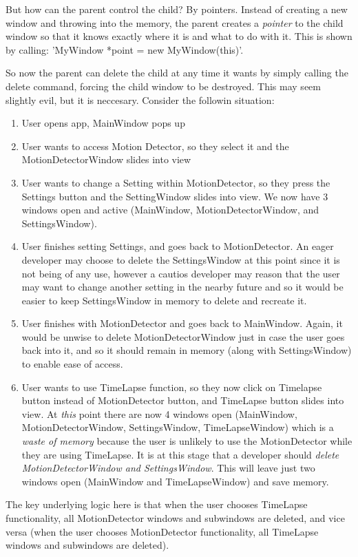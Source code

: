 But how can the parent control the child? By pointers. Instead of creating a new window and throwing into the memory, the parent creates a {\it pointer} to the child window so that it knows exactly where it is and what to do with it. This is shown by calling:
'MyWindow *point = new MyWindow(this)'.

So now the parent can delete the child at any time it wants by simply calling the delete command, forcing the child window to be destroyed. This may seem slightly evil, but it is neccesary. Consider the followin situation:
\begin{enumerate}
\item User opens app, MainWindow pops up
\item User wants to access Motion Detector, so they select it and the MotionDetectorWindow slides into view
\item User wants to change a Setting within MotionDetector, so they press the Settings button and the SettingWindow slides into view. We now have 3 windows open and active (MainWindow, MotionDetectorWindow, and SettingsWindow).
\item User finishes setting Settings, and goes back to MotionDetector. An eager developer may choose to delete the SettingsWindow at this point since it is not being of any use, however a cautios developer may reason that the user may want to change another setting in the nearby future and so it would be easier to keep SettingsWindow in memory to delete and recreate it.
\item User finishes with MotionDetector and goes back to MainWindow. Again, it would be unwise to delete MotionDetectorWindow just in case the user goes back into it, and so it should remain in memory (along with SettingsWindow) to enable ease of access.
\item User wants to use TimeLapse function, so they now click on Timelapse button instead of MotionDetector button, and TimeLapse button slides into view. At {\it this} point there are now 4 windows open (MainWindow, MotionDetectorWindow, SettingsWindow, TimeLapseWindow) which is a {\it waste of memory} because the user is unlikely to use the MotionDetector while they are using TimeLapse. It is at this stage that a developer should {\it delete MotionDetectorWindow and SettingsWindow}. This will leave just two windows open (MainWindow and TimeLapseWindow) and save memory.
\end{enumerate}
The key underlying logic here is that when the user chooses TimeLapse functionality, all MotionDetector windows and subwindows are deleted, and vice versa (when the user chooses MotionDetector functionality, all TimeLapse windows and subwindows are deleted).


